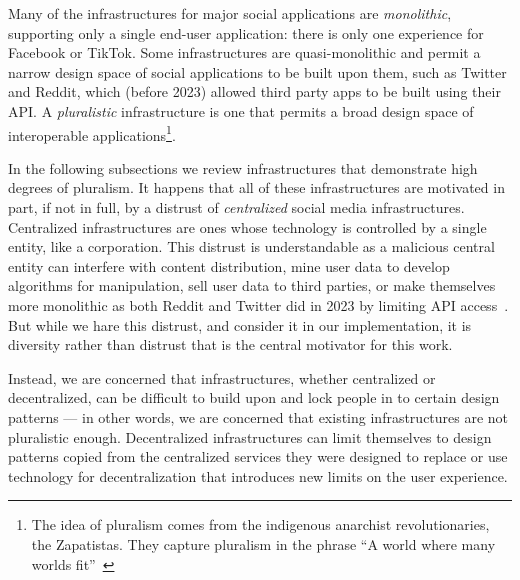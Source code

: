 Many of the infrastructures for major social applications are \emph{monolithic}, supporting only a single end-user application: there is only one experience for Facebook or TikTok.
Some infrastructures are quasi-monolithic and permit a narrow design space of social applications to be built upon them, such as Twitter and Reddit, which (before 2023) allowed third party apps to be built using their API.
A \emph{pluralistic} infrastructure is one that permits a broad design space of interoperable applications\footnote{The idea of pluralism comes from the indigenous anarchist revolutionaries, the Zapatistas. They capture pluralism in the phrase ``A world where many worlds fit''~\cite{designsforthepluriverse,firstworldhahaha}}.


In the following subsections we review infrastructures that demonstrate high degrees of pluralism.
It happens that all of these infrastructures are motivated in part, if not in full, by a distrust of \emph{centralized} social media infrastructures.
Centralized infrastructures are ones whose technology is controlled by a single entity, like a corporation.
This distrust is understandable as a malicious central entity
can interfere with content distribution, mine user data to develop algorithms for manipulation,
sell user data to third parties, or make themselves more monolithic as both Reddit and Twitter did in 2023 by limiting API access~\cite{ageofsurveillancecapitalism, platformsociety, standoutofourlight}.
But while we hare this distrust, and consider it in our implementation, it is diversity rather than distrust that is the central motivator for this work.

Instead, we are concerned that infrastructures, whether centralized or decentralized, can be difficult to build upon and lock people in to certain design patterns --- in other words, we are concerned that existing infrastructures are not pluralistic enough.
Decentralized infrastructures can limit themselves to design patterns copied from the centralized services they were designed to replace or use technology for decentralization that introduces new limits on the user experience.


